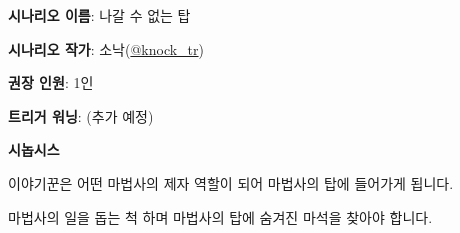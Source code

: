 \documentclass{report}
\begin{document}
	\textbf{시나리오 이름}: 나갈 수 없는 탑
	
	\textbf{시나리오 작가}: 소낙(\href{https://twitter.com/knock_tr}{@knock\_tr})
	
	\textbf{권장 인원}: 1인
	
	\textbf{트리거 워닝}: (추가 예정)
	
	\textbf{시놉시스}
	
	이야기꾼은 어떤 마법사의 제자 역할이 되어 마법사의 탑에 들어가게 됩니다.
  
  마법사의 일을 돕는 척 하며 마법사의 탑에 숨겨진 마석을 찾아야 합니다.
\end{document}
